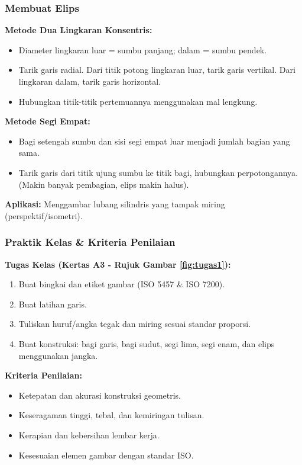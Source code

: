 \documentclass[../gbr_teknik.tex]{subfiles}
\begin{document}
\begin{frame}[mytitle=standard]
	\frametitle{Membuat Elips}

	\textbf{Metode Dua Lingkaran Konsentris:}
	\begin{itemize}
		\item Diameter lingkaran luar = sumbu panjang; dalam = sumbu pendek.
		\item Tarik garis radial. Dari titik potong lingkaran luar, tarik garis vertikal. Dari lingkaran dalam, tarik garis horizontal.
		\item Hubungkan titik-titik pertemuannya menggunakan mal lengkung.
	\end{itemize}

	\textbf{Metode Segi Empat:}
	\begin{itemize}
		\item Bagi setengah sumbu dan sisi segi empat luar menjadi jumlah bagian yang sama.
		\item Tarik garis dari titik ujung sumbu ke titik bagi, hubungkan perpotongannya. (Makin banyak pembagian, elips makin halus).
	\end{itemize}

	\textbf{Aplikasi:} Menggambar lubang silindris yang tampak miring (perspektif/isometri).
\end{frame}

\begin{frame}[mytitle=standard]
	\frametitle{Praktik Kelas \& Kriteria Penilaian}

	\textbf{Tugas Kelas (Kertas A3 - Rujuk Gambar \ref{fig:tugas1}):}
	\begin{enumerate}
		\item Buat bingkai dan etiket gambar (ISO 5457 \& ISO 7200).
		\item Buat latihan garis.
		\item Tuliskan huruf/angka tegak dan miring sesuai standar proporsi.
		\item Buat konstruksi: bagi garis, bagi sudut, segi lima, segi enam, dan elips menggunakan jangka.
	\end{enumerate}

	\vspace{0.5em}
	\textbf{Kriteria Penilaian:}
	\begin{itemize}
		\item Ketepatan dan akurasi konstruksi geometris.
		\item Keseragaman tinggi, tebal, dan kemiringan tulisan.
		\item Kerapian dan kebersihan lembar kerja.
		\item Kesesuaian elemen gambar dengan standar ISO.
	\end{itemize}
\end{frame}
\end{document}
